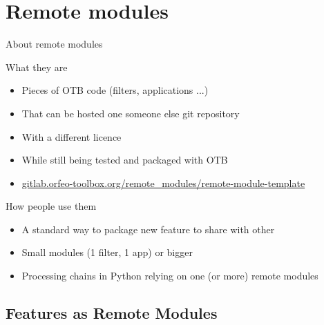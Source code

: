 \section{Remote modules}

\begin{frame}{About remote modules}
\begin{block}{What they are}
  \begin{itemize}
    \item Pieces of OTB code (filters, applications ...)
    \item That can be hosted one someone else git repository
    \item With a different licence
    \item While still being tested and packaged with OTB
    \item \url{gitlab.orfeo-toolbox.org/remote_modules/remote-module-template}
  \end{itemize}
\end{block}

\begin{block}{How people use them}
  \begin{itemize}
    \item A standard way to package new feature to share with other
    \item Small modules (1 filter, 1 app) or bigger
    \item Processing chains in Python relying on one (or more) remote modules
    \end{itemize}
\end{block}  
\end{frame}

\subsection{Features as Remote Modules}

